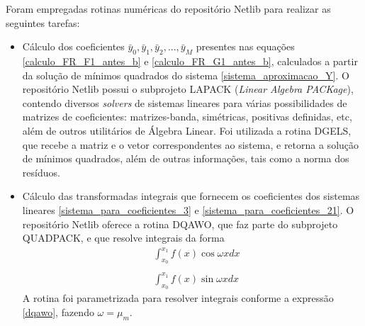 Foram empregadas rotinas numéricas do repositório Netlib para realizar as seguintes tarefas:
\begin{itemize}
	\item Cálculo dos coeficientes $\bar{y}_0, \bar{y}_1, \bar{y}_2, ..., \bar{y}_M$ presentes nas equações \eqref{calculo_FR_F1_antes_b} e \eqref{calculo_FR_G1_antes_b}, calculados a partir da solução de mínimos quadrados do sistema \eqref{sistema_aproximacao_Y}. O repositório Netlib possui o subprojeto LAPACK (\textit{Linear Algebra PACKage}), contendo diversos \textit{solvers} de sistemas lineares para várias possibilidades de matrizes de coeficientes: matrizes-banda, simétricas, positivas definidas, etc, além de outros utilitários de Álgebra Linear. Foi utilizada a rotina DGELS, que recebe a matriz e o vetor correspondentes ao sistema, e retorna a solução de mínimos quadrados, além de outras informações, tais como a norma dos resíduos.
	
	\item Cálculo das transformadas integrais que fornecem os coeficientes dos sistemas lineares \eqref{sistema_para_coeficientes_3} e \eqref{sistema_para_coeficientes_21}. O repositório Netlib oferece a rotina DQAWO, que faz parte do subprojeto QUADPACK, e que resolve integrais da forma
	\begin{align}
	& \int_{x_0}^{x_1} f(x)\cos\omega x dx \label{dqawo} \\ \nonumber \\
	& \int_{x_0}^{x_1} f(x)\sin\omega x dx 
	\end{align}
	A rotina foi parametrizada para resolver integrais conforme a expressão \eqref{dqawo}, fazendo $\omega = \mu_m$.
	

\end{itemize}

